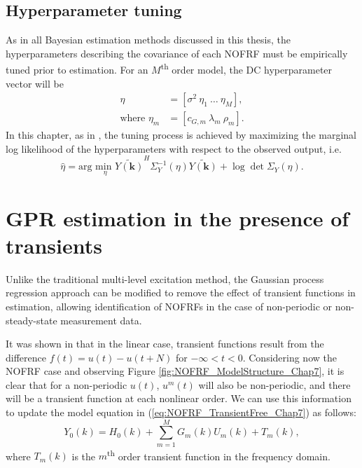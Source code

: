\subsection{Hyperparameter tuning}

As in all Bayesian estimation methods discussed in this thesis, the hyperparameters describing the covariance of each NOFRF must be empirically tuned prior to estimation. For an $M$\textsuperscript{th} order model, the DC hyperparameter vector will be
\begin{align*}
\eta &= [\sigma^2 \ \eta_1 \ \hdots \ \eta_M], \\
\text{where }\eta_m &= [c_{G,m} \ \lambda_m \ \rho_m].
\end{align*}
In this chapter, as in \cite{Lataire2016}, the tuning process is achieved by maximizing the marginal log likelihood of the hyperparameters with respect to the observed output, i.e.
\begin{equation}
\label{eq:NOFRF_HyperparamTuning}
\hat{\eta} = \text{arg } \underset{\eta}{\text{min }} \widetilde{Y(\mathbf{k})}^H \Sigma_Y^{-1}(\eta) \widetilde{Y(\mathbf{k})} + \log \det \Sigma_Y(\eta).
\end{equation} 


\section{GPR estimation in the presence of transients}
\label{sec:NOFRF_TransientEstimation}

Unlike the traditional multi-level excitation method, the Gaussian process regression approach can be modified to remove the effect of transient functions in estimation, allowing identification of NOFRFs in the case of non-periodic or non-steady-state measurement data.

It was shown in \cite{Lataire2016} that in the linear case, transient functions result from the difference $f(t) = u(t)-u(t+N)$ for $-\infty<t<0$. Considering now the NOFRF case and observing Figure \ref{fig:NOFRF_ModelStructure_Chap7}, it is clear that for a non-periodic $u(t)$, $u^m(t)$ will also be non-periodic, and there will be a transient function at each nonlinear order. We can use this information to update the model equation in (\ref{eq:NOFRF_TransientFree_Chap7}) as follows:
\begin{equation}
Y_0(k) = H_0(k) + \sum_{m=1}^{M} G_m(k) U_m(k) + T_m(k),
\end{equation}
where $T_m(k)$ is the $m$\textsuperscript{th} order transient function in the frequency domain. 

